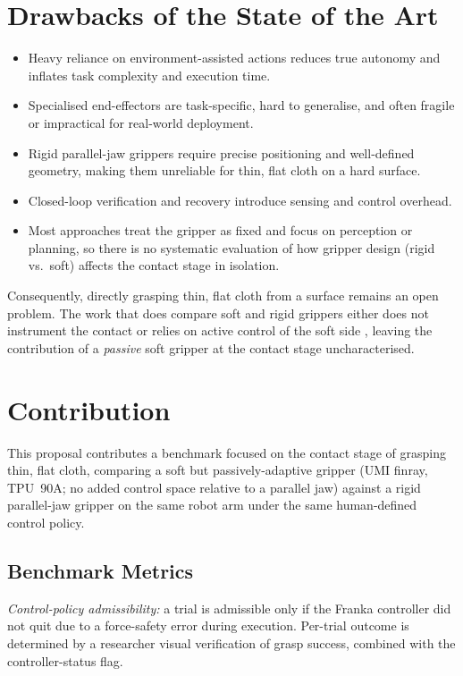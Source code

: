 \documentclass[10pt,letterpaper]{article}
\begin{document}
\section{Drawbacks of the State of the Art}
\label{sec:drawbacks}
\begin{itemize}[leftmargin=*,nosep]
    \item Heavy reliance on environment-assisted actions reduces true
          autonomy and inflates task complexity and execution time.
    \item Specialised end-effectors are task-specific, hard to
          generalise, and often fragile or impractical for real-world
          deployment.
    \item Rigid parallel-jaw grippers require precise positioning and
          well-defined geometry, making them unreliable for thin, flat
          cloth on a hard surface.
    \item Closed-loop verification and recovery introduce sensing and
          control overhead.
    \item Most approaches treat the gripper as fixed and focus on
          perception or planning, so there is no systematic evaluation
          of how gripper design (rigid vs.\ soft) affects the contact
          stage in isolation.
\end{itemize}
Consequently, directly grasping thin, flat cloth from a surface remains
an open problem. The work that does compare soft and rigid grippers
either does not instrument the contact \cite{Clark2023} or relies on
active control of the soft side \cite{Teeple2022}, leaving the
contribution of a \emph{passive} soft gripper at the contact stage
uncharacterised.

\section{Contribution}
\label{sec:contribution}
This proposal contributes a benchmark focused on the contact stage of
grasping thin, flat cloth, comparing a soft but passively-adaptive
gripper (UMI finray, TPU~90A; no added control space relative to a
parallel jaw) against a rigid parallel-jaw gripper on the same robot
arm under the same human-defined control policy.

\subsection{Benchmark Metrics}
\textit{Control-policy admissibility:} a trial is admissible only if
the Franka controller did not quit due to a force-safety error during
execution. Per-trial outcome is determined by a researcher visual
verification of grasp success, combined with the controller-status flag.
\end{document}
